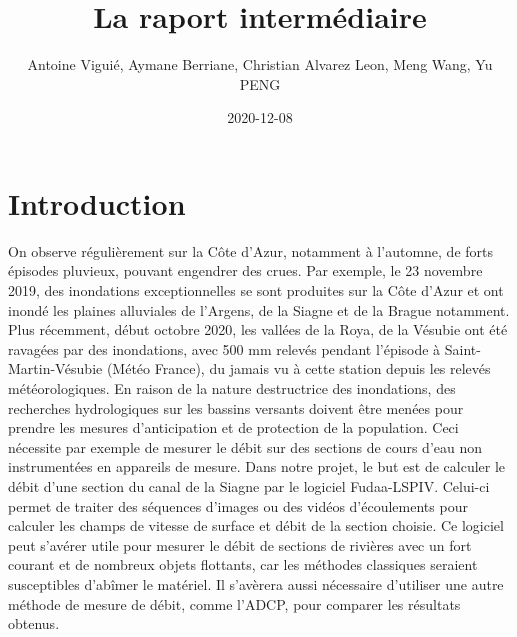 \documentclass[
]{article}
\title{La raport intermédiaire}
\author{Antoine Viguié, Aymane Berriane, Christian Alvarez Leon, Meng Wang, Yu PENG}
\date{2020-12-08}
\begin{document}






{
\setcounter{tocdepth}{2}
\tableofcontents
}


\newpage

\hypertarget{introduction}{%
\section*{Introduction}\label{introduction}}

On observe régulièrement sur la Côte d'Azur, notamment à l'automne, de forts épisodes pluvieux, pouvant engendrer des crues. Par exemple, le 23 novembre 2019, des inondations exceptionnelles se sont produites sur la Côte d'Azur et ont inondé les plaines alluviales de l'Argens, de la Siagne et de la Brague notamment. Plus récemment, début octobre 2020, les vallées de la Roya, de la Vésubie ont été ravagées par des inondations, avec 500 mm relevés pendant l'épisode à Saint-Martin-Vésubie (Météo France), du jamais vu à cette station depuis les relevés météorologiques. En raison de la nature destructrice des inondations, des recherches hydrologiques sur les bassins versants doivent être menées pour prendre les mesures d'anticipation et de protection de la population. Ceci nécessite par exemple de mesurer le débit sur des sections de cours d'eau non instrumentées en appareils de mesure. Dans notre projet, le but est de calculer le débit d'une section du canal de la Siagne par le logiciel Fudaa-LSPIV. Celui-ci permet de traiter des séquences d'images ou des vidéos d'écoulements pour calculer les champs de vitesse de surface et débit de la section choisie. Ce logiciel peut s'avérer utile pour mesurer le débit de sections de rivières avec un fort courant et de nombreux objets flottants, car les méthodes classiques seraient susceptibles d'abîmer le matériel. Il s'avèrera aussi nécessaire d'utiliser une autre méthode de mesure de débit, comme l'ADCP, pour comparer les résultats obtenus.
\end{document}
